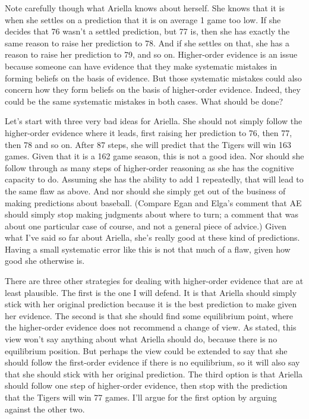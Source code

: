 Note carefully though what \gls{Ariella} knows about herself. She knows that it is when she settles on a prediction that it is on average 1 game too low. If she decides that 76 wasn't a settled prediction, but 77 is, then she has exactly the same reason to raise her prediction to 78. And if she settles on that, she has a reason to raise her prediction to 79, and so on. Higher-order evidence is an issue because someone can have evidence that they make systematic mistakes in forming beliefs on the basis of evidence. But those systematic mistakes could also concern how they form beliefs on the basis of higher-order evidence. Indeed, they could be the same systematic mistakes in both cases. What should be done?

Let's start with three very bad ideas for \gls{Ariella}. She should not simply follow the higher-order evidence where it leads, first raising her prediction to 76, then 77, then 78 and so on. After 87 steps, she will predict that the Tigers will win 163 games. Given that it is a 162 game season, this is not a good idea. Nor should she follow through as many steps of higher-order reasoning as she has the cognitive capacity to do. Assuming she has the ability to add 1 repeatedly, that will lead to the same flaw as above. And nor should she simply get out of the business of making predictions about baseball. (Compare Egan and Elga's comment that AE should simply stop making judgments about where to turn; a comment that was about one particular case of course, and not a general piece of advice.) Given what I've said so far about \gls{Ariella}, she's really good at these kind of predictions. Having a small systematic error like this is not that much of a flaw, given how good she otherwise is.

There are three other strategies for dealing with higher-order evidence that are at least plausible. The first is the one I will defend. It is that \gls{Ariella} should simply stick with her original prediction because it is the best prediction to make given her evidence. The second is that she should find some equilibrium point, where the higher-order evidence does not recommend a change of view. As stated, this view won't say anything about what \gls{Ariella} should do, because there is no equilibrium position. But perhaps the view could be extended to say that she should follow the first-order evidence if there is no equilibrium, so it will also say that she should stick with her original prediction. The third option is that \gls{Ariella} should follow one step of higher-order evidence, then stop with the prediction that the Tigers will win 77 games. I'll argue for the first option by arguing against the other two.

